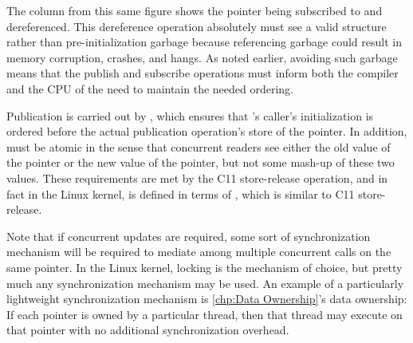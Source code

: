 The  column from this same figure shows
the pointer being subscribed to and dereferenced.
This dereference operation absolutely must see a valid 
structure rather than pre-initialization garbage because referencing
garbage could result in memory corruption, crashes, and hangs.
As noted earlier, avoiding such garbage means that the publish and
subscribe operations must inform both the compiler and the CPU of the
need to maintain the needed ordering.

Publication is carried out by , which ensures that
's caller's initialization is ordered before the actual
publication operation's store of the pointer.
In addition,  must be atomic in the sense that 
concurrent readers see either the old value of the pointer or the new
value of the pointer, but not some mash-up of these two values.
These requirements are met by the C11 store-release operation, and in
fact in the Linux kernel,  is defined in terms
of , which is similar to C11 store-release.

Note that if concurrent updates are required, some sort of synchronization
mechanism will be required to mediate among multiple concurrent
 calls on the same pointer.
In the Linux kernel, locking is the mechanism of choice, but pretty
much any synchronization mechanism may be used.
An example of a particularly lightweight synchronization mechanism is
\cref{chp:Data Ownership}'s data ownership:
If each pointer is owned by a particular thread, then that thread may
execute  on that pointer with no additional
synchronization overhead.

\QuickQuizEnd

